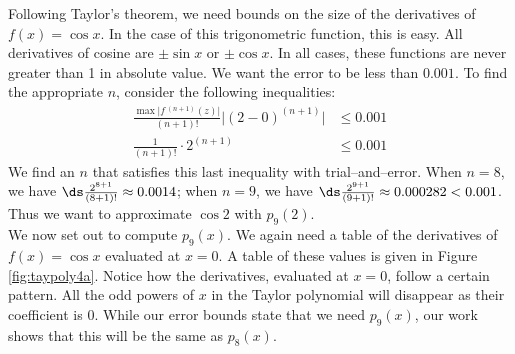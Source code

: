 {Following Taylor's theorem, we need bounds on the size of the derivatives of $f(x)=\cos x$. In the case of this trigonometric function, this is easy. All derivatives of cosine are $\pm \sin x$ or $\pm \cos x$. In all cases, these functions are never greater than 1 in absolute value. We want the error to be less than $0.001$. To find the appropriate $n$, consider the following inequalities:
\begin{align*}
\frac{\max\big\lvert f\,^{(n+1)}(z)\big\rvert}{(n+1)!}\big\lvert(2-0)^{(n+1)}\big\rvert &\leq 0.001 \\
\frac1{(n+1)!}\cdot2^{(n+1)} &\leq 0.001
\end{align*}
We find an $n$ that satisfies this last inequality with trial--and--error. When $n=8$, we have $\ds \frac{2^{8+1}}{(8+1)!} \approx 0.0014$; when $n=9$, we have $\ds \frac{2^{9+1}}{(9+1)!} \approx 0.000282 <0.001$. Thus we want to approximate $\cos 2$ with $p_9(2)$.\\

We now set out to compute $p_9(x)$. We again need a table of the derivatives of $f(x)=\cos x$ evaluated at $x=0$. A table of these values is given in Figure \ref{fig:taypoly4a}.
Notice how the derivatives, evaluated at $x=0$, follow a certain pattern. All the odd powers of $x$ in the Taylor polynomial will disappear as their coefficient is 0. While our error bounds state that we need $p_9(x)$, our work shows that this will be the same as $p_8(x)$. 

}
